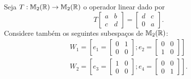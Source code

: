 Seja $T : \mathbb{M}_2(\mathbb{R}) \to \mathbb{M}_2(\mathbb{R})$ o operador linear dado por
\[
    T \begin{bmatrix}
        a & b\\
        c & d
    \end{bmatrix} = \begin{bmatrix}
        d & c\\
        0 & a
    \end{bmatrix}.
\]
Considere tamb\'em os seguintes subespa\c{c}os de $\mathbb{M}_2(\mathbb{R})$:
\begin{align*}
    W_1 = \left[e_1 = \begin{bmatrix}
        0 & 1\\
        0 & 0
    \end{bmatrix}; e_2 = \begin{bmatrix}
        0 & 0\\
        1 & 0
    \end{bmatrix}\right]\\
    W_2 = \left[e_3 = \begin{bmatrix}
        1 & 0\\
        0 & 0
    \end{bmatrix}; e_4 = \begin{bmatrix}
        0 & 0\\
        0 & 1
    \end{bmatrix}\right].
\end{align*}

